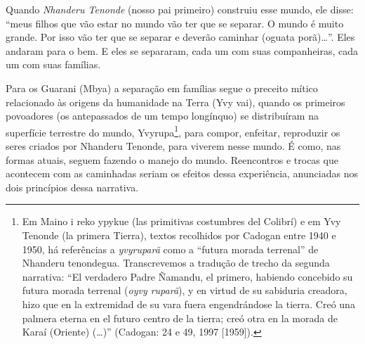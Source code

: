 {{Quando \emph{Nhanderu Tenonde} (nosso pai primeiro) construiu esse mundo, ele
disse: ``meus filhos que vão estar no mundo vão ter que se separar. O
mundo é muito grande. Por isso vão ter que se separar e deverão
caminhar (oguata porã)\ldots{}''. Eles andaram para o bem. E eles se
separaram, cada um com suas companheiras, cada um com suas famílias. 

Para os Guarani (Mbya) a separação em famílias segue o preceito mítico
relacionado às origens da humanidade na Terra (Yvy vai), quando os
primeiros povoadores (os antepassados de um tempo longínquo) se
distribuíram na superfície terrestre do mundo, Yvyrupa\footnote{Em
Maino i reko ypykue (las primitivas costumbres del Colibrí) e em Yvy
Tenonde (la primera Tierra), textos recolhidos por Cadogan entre 1940 e
1950, há referências a \emph{yvyruparã} como a ``futura morada terrenal'' de
Nhanderu tenondegua. Transcrevemos a tradução de trecho da segunda
narrativa: ``El verdadero Padre Ñamandu, el primero, habiendo concebido
su futura morada terrenal (\emph{oyvy ruparã}), y en virtud de su sabiduria
creadora, hizo que en la extremidad de su vara fuera engendrándose la
tierra. Creó una palmera eterna en el futuro centro de la tierra; creó
otra en la morada de Karaí (Oriente) (\ldots{})'' (Cadogan: 24 e 49, 1997
[1959]).}, para compor, enfeitar, reproduzir os seres criados por
Nhanderu Tenonde, para viverem nesse mundo.  É como, nas formas atuais,
seguem fazendo o manejo do mundo. Reencontros e trocas que acontecem
com as caminhadas seriam os efeitos dessa experiência, anunciadas nos
dois princípios dessa narrativa.

}}
